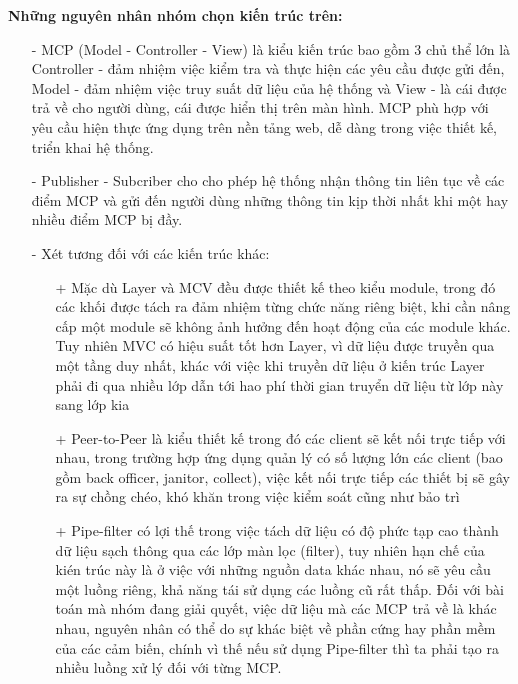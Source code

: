 	\quad \textbf{Những nguyên nhân nhóm chọn kiến trúc trên:}
	\begin{enumerate}
		\item[-] MCP (Model - Controller - View) là kiểu kiến trúc bao gồm 3 chủ thể lớn là Controller - đảm nhiệm việc kiểm tra và thực hiện các yêu cầu được gửi đến, Model - đảm nhiệm việc truy suất dữ liệu của hệ thống và View - là cái được trả về cho người dùng, cái được hiển thị trên màn hình. MCP phù hợp với yêu cầu hiện thực ứng dụng trên nền tảng web, dễ dàng trong việc thiết kế, triển khai hệ thống.
		\item[-] Publisher - Subcriber cho cho phép hệ thống nhận thông tin liên tục về các điểm MCP và gửi đến người dùng những thông tin kịp thời nhất khi một hay nhiều điểm MCP bị đầy.
		\item[-] Xét tương đối với các kiến trúc khác:
		\begin{enumerate}
			\item[+] Mặc dù Layer và MCV đều được thiết kế theo kiểu module, trong đó các khối được tách ra đảm nhiệm từng chức năng riêng biệt, khi cần nâng cấp một module sẽ không ảnh hưởng đến hoạt động của các module khác. Tuy nhiên MVC có hiệu suất tốt hơn Layer, vì dữ liệu được truyền qua một tầng duy nhất, khác với việc khi truyền dữ liệu ở kiến trúc Layer phải đi qua nhiều lớp dẫn tới hao phí thời gian truyển dữ liệu từ lớp này sang lớp kia
			\item[+] Peer-to-Peer là kiểu thiết kế trong đó các client sẽ kết nối trực tiếp với nhau, trong trường hợp ứng dụng quản lý có số lượng lớn các client (bao gồm back officer, janitor, collect), việc kết nối trực tiếp các thiết bị sẽ gây ra sự chồng chéo, khó khăn trong việc kiểm soát cũng như bảo trì
			\item[+] Pipe-filter có lợi thế trong việc tách dữ liệu có độ phức tạp cao thành dữ liệu sạch thông qua các lớp màn lọc (filter), tuy nhiên hạn chế của kién trúc này là ở việc với những nguồn data khác nhau, nó sẽ yêu cầu một luồng riêng, khả năng tái sử dụng các luồng cũ rất thấp. Đối với bài toán mà nhóm đang giải quyết, việc dữ liệu mà các MCP trả về là khác nhau, nguyên nhân có thể do sự khác biệt về phần cứng hay phần mềm của các cảm biến, chính vì thế nếu sử dụng Pipe-filter thì ta phải tạo ra nhiều luồng xử lý đối với từng MCP.
		\end{enumerate}
	\end{enumerate}
  
